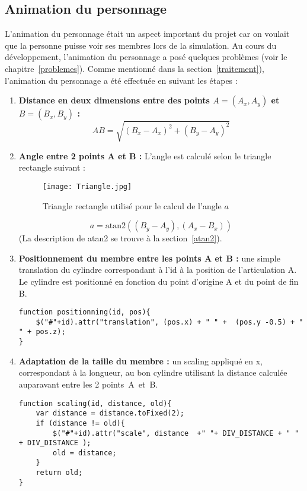\subsection*{Animation du personnage} \label{animationPersonnage}
L'animation du personnage était un aspect important du projet car on voulait que la personne puisse voir ses membres lors de la simulation. Au cours du développement, l'animation du personnage a posé quelques problèmes (voir le chapitre~\ref{problemes}). Comme mentionné dans la section~\ref{traitement}), l'animation du personnage a été effectuée en suivant les étapes : \\

\begin{enumerate}

\item \textbf{Distance en deux dimensions entre des points $A=(A_x,A_y)$ et $B=(B_x,B_y)$ :}
\begin{equation}
AB = \sqrt{(B_x - A_x)^2 + (B_y - A_y)^2}
\end{equation}

\item \textbf{Angle entre 2 points A et B : }
L'angle est calculé selon le triangle rectangle suivant : 

\begin{figure}[H]
\centering
	\texttt{[image: Triangle.jpg]}
	\caption{\label{triangle} Triangle rectangle utilisé pour le calcul de l'angle $a$}
\end{figure}

\begin{equation}
a = \mathrm{atan2}((B_y - A_y), (A_x - B_x))
\end{equation}
(La description de atan2 se trouve à la section~\ref{atan2}).\\

\item  \textbf{Positionnement du membre entre les points A et B :} une simple translation du cylindre correspondant à l'id à la position de l'articulation A. Le cylindre est positionné en fonction du point d'origine A et du point de fin B.

\begin{lstlisting}
function positionning(id, pos){
	$("#"+id).attr("translation", (pos.x) + " " +  (pos.y -0.5) + " " + pos.z);
}
\end{lstlisting}
\pagebreak
\item  \textbf{Adaptation de la taille du membre : } un \textsf{scaling} appliqué en x, correspondant à la longueur, au bon cylindre utilisant la distance calculée auparavant entre les 2 points~A~et~B.
\begin{lstlisting}
function scaling(id, distance, old){
	var distance = distance.toFixed(2);
	if (distance != old){
		$("#"+id).attr("scale", distance  +" "+ DIV_DISTANCE + " " + DIV_DISTANCE );
		old = distance;
	}
	return old;
}
\end{lstlisting}


\end{enumerate}

